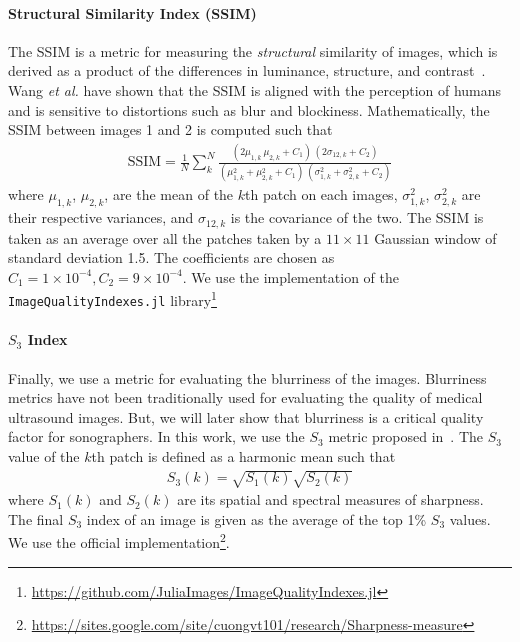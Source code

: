 \paragraph{Structural Similarity Index (SSIM)}
The SSIM is a metric for measuring the \textit{structural} similarity of images, which is derived as a product of the differences in luminance, structure, and contrast~\cite{wang_image_2004a}.
Wang \textit{et al.} have shown that the SSIM is aligned with the perception of humans and is sensitive to distortions such as blur and blockiness.
Mathematically, the SSIM between images 1 and 2 is computed such that
{
\begin{align*}
  \mathrm{SSIM} = \frac{1}{N} \sum_k^N \frac{
    (2 \mu_{1,k} \, \mu_{2, k} + C_1)\,(2 \sigma_{12, k} + C_2)
  }{
    (\mu_{1,k}^2 + \mu_{2,k}^2 + C_1)\,( \sigma_{1,k}^2 + \sigma_{2,k}^2 + C_2)
  }
\end{align*}
}
{\noindent}where \(\mu_{1,k}\), \(\mu_{2,k}\), are the mean of the \(k\)th patch on each images, \(\sigma_{1,k}^2\), \(\sigma_{2,k}^2\) are their respective variances, and \(\sigma_{12, k}\) is the covariance of the two.
The SSIM is taken as an average over all the patches taken by a \(11 \times 11\) Gaussian window of standard deviation 1.5.
The coefficients are chosen as \(C_1 = 1 \times 10^{-4}, C_2 = 9 \times 10^{-4} \).
We use the implementation of the \texttt{ImageQualityIndexes.jl} library\footnote{\url{https://github.com/JuliaImages/ImageQualityIndexes.jl}}

\paragraph{\(S_3\) Index}
Finally, we use a metric for evaluating the blurriness of the images.
Blurriness metrics have not been traditionally used for evaluating the quality of medical ultrasound images.
But, we will later show that blurriness is a critical quality factor for sonographers.
In this work, we use the \(S_3\) metric proposed in~\cite{vu_bf_2012}.
The \(S_3\) value of the \(k\)th patch is defined as a harmonic mean such that
\begin{align*}
  S_3\left(k\right) = \sqrt{S_1\left(k\right)} \sqrt{S_2\left(k\right)}
\end{align*}
{\noindent}where \(S_1\left(k\right)\) and \(S_2\left(k\right)\) are its spatial and spectral measures of sharpness.
The final \(S_3\) index of an image is given as the average of the top 1\% \(S_3\) values.
We use the official implementation\footnote{\url{https://sites.google.com/site/cuongvt101/research/Sharpness-measure}}.

